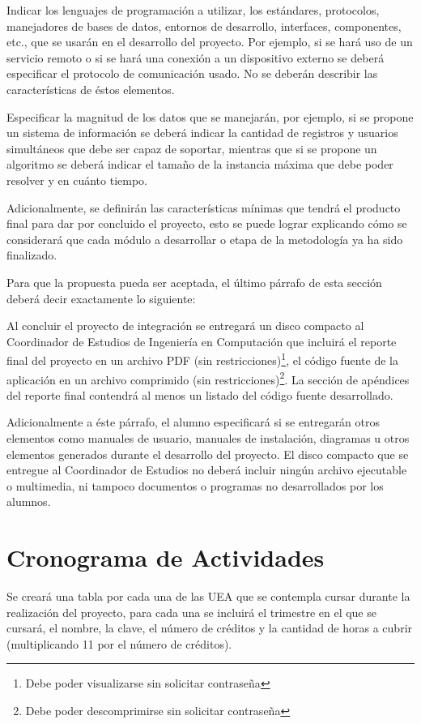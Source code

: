 Indicar los lenguajes de programación a utilizar, los estándares, protocolos, manejadores de bases de datos, entornos de desarrollo, interfaces, componentes, etc., que se usarán en el desarrollo del proyecto. Por ejemplo, si se hará uso de un servicio remoto o si se hará una conexión a un dispositivo externo se deberá especificar el protocolo de comunicación usado. No se deberán describir las características de éstos elementos.

Especificar la magnitud de los datos que se manejarán, por ejemplo, si se propone un sistema de información se deberá indicar la cantidad de registros y usuarios simultáneos que debe ser capaz de soportar, mientras que si se propone un algoritmo se deberá indicar el tamaño de la instancia máxima que debe poder resolver y en cuánto tiempo.

Adicionalmente, se definirán las características mínimas que tendrá el producto final para dar por concluido el proyecto, esto se puede lograr explicando cómo se considerará que cada módulo a desarrollar o etapa de la metodología ya ha sido finalizado.

Para que la propuesta pueda ser aceptada, el último párrafo de esta sección deberá decir exactamente lo siguiente:

Al concluir el proyecto de integración se entregará un disco compacto al Coordinador de Estudios de Ingeniería en Computación que incluirá el reporte final del proyecto en un archivo PDF (sin restricciones)\footnote{Debe poder visualizarse sin solicitar contraseña}, el código fuente de la aplicación en un archivo comprimido (sin restricciones)\footnote{Debe poder descomprimirse sin solicitar contraseña}. La sección de apéndices del reporte final contendrá al menos un listado del código fuente desarrollado.

Adicionalmente a éste párrafo, el alumno especificará si se entregarán otros elementos como manuales de usuario, manuales de instalación, diagramas u otros elementos generados durante el desarrollo del proyecto. El disco compacto que se entregue al Coordinador de Estudios no deberá incluir ningún archivo ejecutable o multimedia, ni tampoco documentos o programas no desarrollados por los alumnos.

\section*{Cronograma de Actividades}

Se creará una tabla por cada una de las UEA que se contempla cursar durante la realización del proyecto, para cada una se incluirá el trimestre en el que se cursará, el nombre, la clave, el número de créditos y la cantidad de horas a cubrir (multiplicando 11 por el número de créditos).

